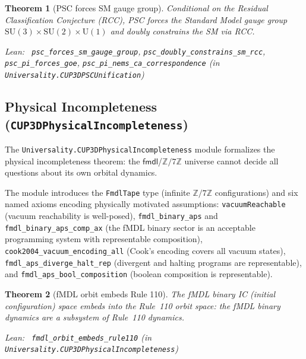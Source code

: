 \documentclass[11pt,a4paper]{article}
\newenvironment{leanref}%
  {\par\smallskip\noindent\begingroup\raggedright\textup{Lean:}~}%
  {\par\endgroup}
\newtheorem{theorem}{Theorem}[section]
\theoremstyle{definition}
\begin{document}
\begin{theorem}[PSC forces SM gauge group]\label{thm:psc-gauge}
Conditional on the Residual Classification Conjecture (RCC), PSC forces the Standard
Model gauge group $\mathrm{SU}(3)\times\mathrm{SU}(2)\times\mathrm{U}(1)$ and
doubly constrains the SM via RCC.

\begin{leanref}
\lstinline|psc_forces_sm_gauge_group|, \lstinline|psc_doubly_constrains_sm_rcc|,
\lstinline|psc_pi_forces_goe|, \lstinline|psc_pi_nems_ca_correspondence|
\textup{(in \texttt{Universality.CUP3DPSCUnification})}
\end{leanref}
\end{theorem}

\subsection{Physical Incompleteness (\texttt{CUP3DPhysicalIncompleteness})}\label{subsec:cup3d-physical-incompleteness}

The \texttt{Universality.CUP3DPhysicalIncompleteness} module formalizes the physical
incompleteness theorem: the $\mathsf{fmdl}$/$\mathbb{Z}/7\mathbb{Z}$ universe cannot
decide all questions about its own orbital dynamics.

The module introduces the \texttt{FmdlTape} type (infinite $\mathbb{Z}/7\mathbb{Z}$
configurations) and six named axioms encoding physically motivated assumptions:
\texttt{vacuumReachable} (vacuum reachability is well-posed),
\texttt{fmdl\_binary\_aps} and \texttt{fmdl\_binary\_aps\_comp\_ax}
(the fMDL binary sector is an acceptable programming system with representable composition),
\texttt{cook2004\_vacuum\_encoding\_all} (Cook's encoding covers all vacuum states),
\texttt{fmdl\_aps\_diverge\_halt\_rep} (divergent and halting programs are representable),
and \texttt{fmdl\_aps\_bool\_composition} (boolean composition is representable).

\begin{theorem}[fMDL orbit embeds Rule 110]\label{thm:fmdl-orbit-embeds}
The fMDL binary IC (initial configuration) space embeds into the Rule~110 orbit space:
the fMDL binary dynamics are a subsystem of Rule~110 dynamics.

\begin{leanref}
\lstinline|fmdl_orbit_embeds_rule110|
\textup{(in \texttt{Universality.CUP3DPhysicalIncompleteness})}
\end{leanref}
\end{theorem}
\end{document}
